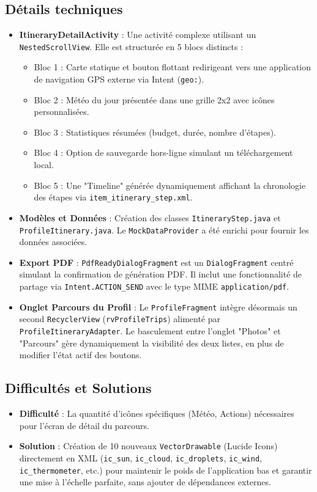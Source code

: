 \documentclass{article}
\begin{document}
\subsection{Détails techniques}
\begin{itemize}
    \item \textbf{ItineraryDetailActivity} : Une activité complexe utilisant un \texttt{NestedScrollView}. Elle est structurée en 5 blocs distincts :
    \begin{itemize}
        \item Bloc 1 : Carte statique et bouton flottant redirigeant vers une application de navigation GPS externe via Intent (\texttt{geo:}).
        \item Bloc 2 : Météo du jour présentée dans une grille 2x2 avec icônes personnalisées.
        \item Bloc 3 : Statistiques résumées (budget, durée, nombre d'étapes).
        \item Bloc 4 : Option de sauvegarde hors-ligne simulant un téléchargement local.
        \item Bloc 5 : Une "Timeline" générée dynamiquement affichant la chronologie des étapes via \texttt{item\_itinerary\_step.xml}.
    \end{itemize}
    \item \textbf{Modèles et Données} : Création des classes \texttt{ItineraryStep.java} et \texttt{ProfileItinerary.java}. Le \texttt{MockDataProvider} a été enrichi pour fournir les données associées.
    \item \textbf{Export PDF} : \texttt{PdfReadyDialogFragment} est un \texttt{DialogFragment} centré simulant la confirmation de génération PDF. Il inclut une fonctionnalité de partage via \texttt{Intent.ACTION\_SEND} avec le type MIME \texttt{application/pdf}.
    \item \textbf{Onglet Parcours du Profil} : Le \texttt{ProfileFragment} intègre désormais un second \texttt{RecyclerView} (\texttt{rvProfileTrips}) alimenté par \texttt{ProfileItineraryAdapter}. Le basculement entre l'onglet "Photos" et "Parcours" gère dynamiquement la visibilité des deux listes, en plus de modifier l'état actif des boutons.
\end{itemize}

\subsection{Difficultés et Solutions}
\begin{itemize}
    \item \textbf{Difficulté} : La quantité d'icônes spécifiques (Météo, Actions) nécessaires pour l'écran de détail du parcours.
    \item \textbf{Solution} : Création de 10 nouveaux \texttt{VectorDrawable} (Lucide Icons) directement en XML (\texttt{ic\_sun}, \texttt{ic\_cloud}, \texttt{ic\_droplets}, \texttt{ic\_wind}, \texttt{ic\_thermometer}, etc.) pour maintenir le poids de l'application bas et garantir une mise à l'échelle parfaite, sans ajouter de dépendances externes.
\end{itemize}
\end{document}
